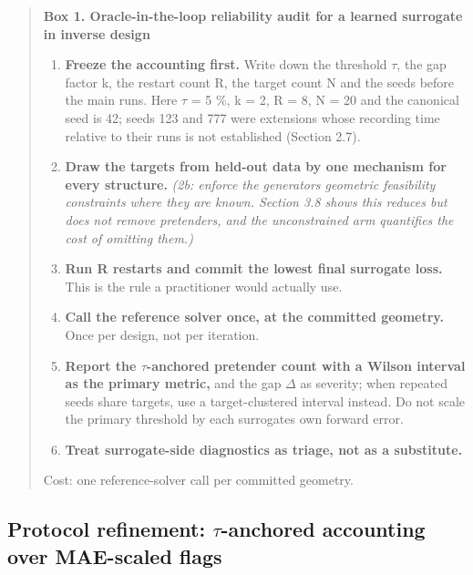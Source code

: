 \documentclass[11pt,a4paper]{article}
\providecommand{\tightlist}{\setlength{\itemsep}{0pt}\setlength{\parskip}{0pt}}
\begin{document}
\begin{quote}
\textbf{Box 1. Oracle-in-the-loop reliability audit for a learned surrogate in inverse design}

\begin{enumerate}
\def\labelenumi{\arabic{enumi}.}
\tightlist
\item
  \textbf{Freeze the accounting first.} Write down the threshold \ensuremath{\tau}, the gap factor k, the
  restart count R, the target count N and the seeds before the main runs. Here
  \ensuremath{\tau} = 5 \%, k = 2, R = 8, N = 20 and the canonical seed is 42; seeds 123 and 777
  were extensions whose recording time relative to their runs is not established
  (Section 2.7).
\item
  \textbf{Draw the targets from held-out data by one mechanism for every structure.}
  \emph{(2b: enforce the generator\textquotesingle s geometric feasibility constraints where they are known.
  Section 3.8 shows this reduces but does not remove pretenders, and the unconstrained arm
  quantifies the cost of omitting them.)}
\item
  \textbf{Run R restarts and commit the lowest final surrogate loss.} This is the rule a
  practitioner would actually use.
\item
  \textbf{Call the reference solver once, at the committed geometry.} Once per design, not
  per iteration.
\item
  \textbf{Report the \ensuremath{\tau}-anchored pretender count with a Wilson interval as the primary metric,} and the gap \ensuremath{\Delta} as severity; when repeated seeds share targets, use a target-clustered interval instead. Do not scale the primary threshold by each
  surrogate\textquotesingle s own forward error.
\item
  \textbf{Treat surrogate-side diagnostics as triage, not as a substitute.}
\end{enumerate}

Cost: one reference-solver call per committed geometry.
\end{quote}

\subsection{Protocol refinement: \ensuremath{\tau}-anchored accounting over MAE-scaled flags}\label{sec:4.5}
\end{document}
